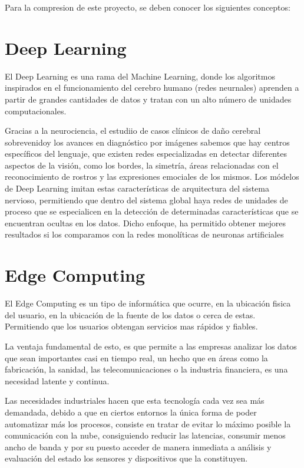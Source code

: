 
Para la compresion de este proyecto, se deben conocer los siguientes conceptos:

\section{Deep Learning} 

El Deep Learning \cite{deepLearning} es una rama del Machine Learning, donde los algoritmos inspirados en el funcionamiento del cerebro humano (redes neurnales) aprenden a partir de 
grandes cantidades de datos y tratan con un alto número de unidades computacionales.

Gracias a la neurociencia, el estudiio de casos clínicos de daño cerebral sobrevenidoy los avances en diagnóstico por imágenes sabemos que hay centros específicos del lenguaje, que 
existen redes especializadas en detectar diferentes aspectos de la visión, como los bordes, la simetría, áreas relacionadas con el reconocimiento de rostros y las expresiones emociales de los mismos.
Los módelos de Deep Learning imitan estas características de arquitectura del sistema nervioso, permitiendo que dentro del sistema global haya redes de unidades de proceso que se especialicen en la detección
de determinadas características que se encuentran ocultas en los datos. Dicho enfoque, ha permitido obtener mejores resultados si los comparamos con la redes monolíticas de neuronas artificiales


\section{Edge Computing}

El Edge Computing \cite{edgeComputing} es un tipo de informática que ocurre, en la ubicación fisica del usuario, en la ubicación de la fuente de los datos o cerca de estas. Permitiendo 
que los usuarios obtengan servicios mas rápidos y fiables.

La ventaja fundamental de esto, es que permite a las empresas analizar los datos que sean importantes casi en tiempo real, un hecho que en áreas como la fabricación, la sanidad,
las telecomunicaciones o la industria financiera, es una necesidad latente y continua.

Las necesidades industriales hacen que esta tecnología cada vez sea más demandada, debido a que en ciertos entornos la única forma de poder automatizar más los procesos, consiste en tratar
de evitar lo máximo posible la comunicación con la nube, consiguiendo reducir las latencias, consumir menos ancho de banda y por su puesto acceder de manera inmediata a análisis y evaluación
del estado los sensores y dispositivos que la constituyen.

